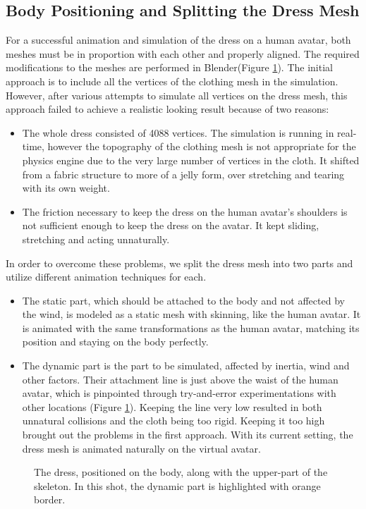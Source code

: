 \subsection{Body Positioning and Splitting the Dress Mesh}

For a successful animation and simulation of the dress on a human avatar, both meshes must be in proportion with each other and properly aligned. The required modifications to the meshes are performed in Blender(Figure \ref{fig:dress_and_body}). The initial approach is to include all the vertices of the clothing mesh in the simulation. However, after various attempts to simulate all vertices on the dress mesh, this approach failed to achieve a realistic looking result because of two reasons:
\begin{itemize}
\item The whole dress consisted of 4088 vertices. The simulation is running in real-time, however the topography of the clothing mesh is not appropriate for the physics engine due to the very large number of vertices in the cloth. It shifted from a fabric structure to more of a jelly form, over stretching and tearing with its own weight.
\item The friction necessary to keep the dress on the human avatar's shoulders is not sufficient enough to keep the dress on the avatar. It kept sliding, stretching and acting unnaturally.
\end{itemize}

In order to overcome these problems, we split the dress mesh into two parts and utilize different animation techniques for each.

\begin{itemize}
\item The static part, which should be attached to the body and not affected by the wind, is modeled as a static mesh with skinning, like the human avatar. It is animated with the same transformations as the human avatar, matching its position and staying on the body perfectly. 
\item The dynamic part is the part to be simulated, affected by inertia, wind and other factors. Their attachment line is just above the waist of the human avatar, which is pinpointed through try-and-error experimentations with other locations (Figure \ref{fig:dress_and_body}). Keeping the line very low resulted in both unnatural collisions and the cloth being too rigid. Keeping it too high brought out the problems in the first approach. With its current setting, the dress mesh is animated naturally on the virtual avatar.
\end{itemize}

\begin{figure}[h]
\centerline{}
\caption{The dress, positioned on the body, along with the upper-part of the skeleton. In this shot, the dynamic part is highlighted with orange border.}
\label{fig:dress_and_body}
\end{figure}

